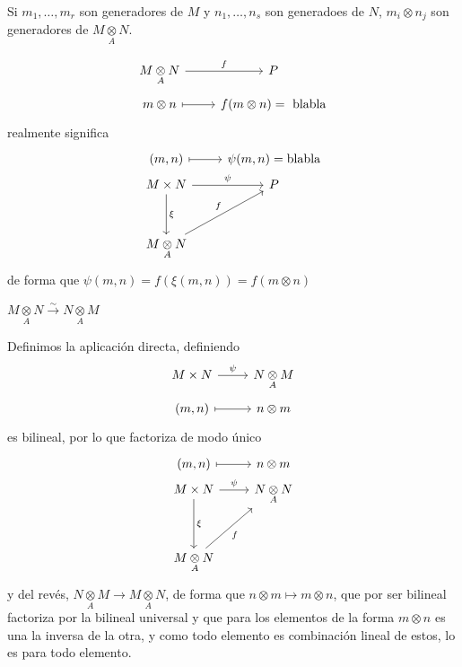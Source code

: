 \begin{ejer}
    Si $m_1,\ldots, m_r$ son generadores de $M$ y $n_1,\ldots, n_s$ son generadoes de $N$, $m_i\otimes n_j$ son generadores de $M\underset{A}{\otimes} N$. 
\end{ejer}
\begin{obs}
    $$\bt M \underset{A}{\otimes} N \arrow{r}{f} & P \\[-5mm] m \otimes n \arrow[mapsto]{r} & f(m\otimes n)= \text{ blabla}\et$$
    realmente significa
    $$\bt (m,n) \arrow[mapsto]{r} & \psi(m,n) = \text{blabla} \\[-5mm] M \times N \arrow{r}{\psi} \arrow{d}{\xi} & P \\[5mm] M \underset{A}{\otimes} N \arrow{ru}{f} \et$$
    de forma que $\psi(m,n) = f(\xi(m,n)) = f(m \otimes n)$
\end{obs}
\begin{propi} $M \underset{A}{\otimes} N \overset{\sim}{\longrightarrow} N \underset{A}{\otimes} M$
\end{propi}
        \begin{dem}
            Definimos la aplicaci\'on directa, definiendo $$\bt M \times N \arrow{r}{\psi} & N \underset{A}{\otimes} M \\[-5mm] (m,n)\arrow[mapsto]{r} & n \otimes m \et$$ es bilineal, por lo que factoriza de modo \'unico
            $$\bt (m,n) \arrow[mapsto]{r} & n \otimes m \\[-5mm] M \times N \arrow{r}{\psi} \arrow{d}{\xi} & N \underset{A}{\otimes} N \\[5mm] M \underset{A}{\otimes} N \arrow{ru}[swap]{f} \et$$
             y del rev\'es, $N\underset{A}{\otimes} M \longrightarrow M \underset{A}{\otimes} N $, de forma que $n \otimes m \longmapsto m \otimes n$, que por ser bilineal factoriza por la bilineal universal y que para los elementos de la forma $m \otimes n$ es una la inversa de la otra, y como todo elemento es combinaci\'on lineal de estos, lo es para todo elemento.
        \end{dem} 

